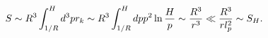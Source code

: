 \begin{equation}
S\sim R^{3}\int_{1/R}^{H}d^{3}pr_{k}\sim R^{3}\int_{1/R}^{H}dpp^{2}\ln \frac{%
H}{p}\sim \frac{R^{3}}{r^{3}}\ll \frac{R^{3}}{rl_{p}^{2}}\sim S_{H}.
\label{scmb}
\end{equation}

